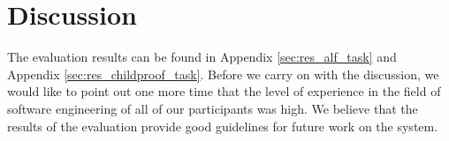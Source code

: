 \section{Discussion} %
\label{sec:eval_discussion}



The evaluation results can be found in Appendix \ref{sec:res_alf_task} and Appendix \ref{sec:res_childproof_task}. Before we carry on with the discussion, we would like to point out one more time that the level of experience in the field of software engineering of all of our participants was high. We believe that the results of the evaluation provide good guidelines for future work on the system.\\

